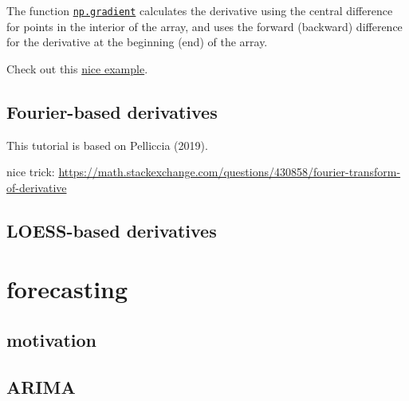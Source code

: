 \documentclass[
  letterpaper,
  DIV=11,
  numbers=noendperiod,
  oneside]{scrreprt}
\begin{document}
The function
\href{https://numpy.org/doc/stable/reference/generated/numpy.gradient.html}{\texttt{np.gradient}}
calculates the derivative using the central difference for points in the
interior of the array, and uses the forward (backward) difference for
the derivative at the beginning (end) of the array.


Check out this
\href{https://gist.github.com/astrojuanlu/e4d47fec5d94d2224762a61680419eb2}{nice
example}.

\hypertarget{fourier-based-derivatives}{%
\chapter{Fourier-based derivatives}\label{fourier-based-derivatives}}

This tutorial is based on Pelliccia (2019).

nice trick:
\url{https://math.stackexchange.com/questions/430858/fourier-transform-of-derivative}

\hypertarget{loess-based-derivatives}{%
\chapter{LOESS-based derivatives}\label{loess-based-derivatives}}

\part{forecasting}

\hypertarget{motivation-9}{%
\chapter{motivation}\label{motivation-9}}

\hypertarget{arima}{%
\chapter{ARIMA}\label{arima}}
\end{document}
